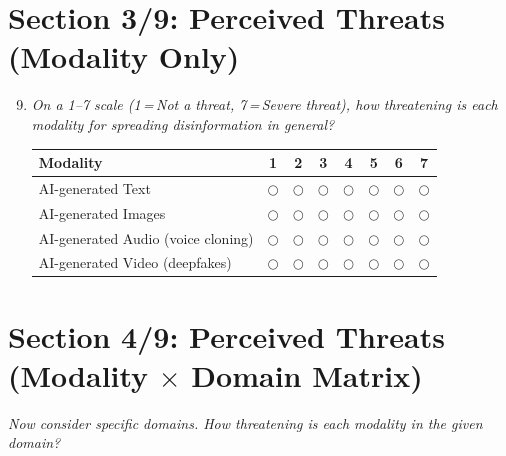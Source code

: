 \section*{Section 3/9: Perceived Threats (Modality Only)}

\begin{enumerate}[label=\textbf{Q\arabic*.}, leftmargin=3em]
\setcounter{enumi}{8}

    \item \textit{On a 1--7 scale (1\,=\,Not a threat, 7\,=\,Severe threat), how threatening is each modality for spreading disinformation in general?}

    \medskip
    \noindent\begin{tabular}{l ccccccc}
    \toprule
    \textbf{Modality} & \textbf{1} & \textbf{2} & \textbf{3} & \textbf{4} & \textbf{5} & \textbf{6} & \textbf{7} \\
    \midrule
    AI-generated Text   & $\bigcirc$ & $\bigcirc$ & $\bigcirc$ & $\bigcirc$ & $\bigcirc$ & $\bigcirc$ & $\bigcirc$ \\
    AI-generated Images & $\bigcirc$ & $\bigcirc$ & $\bigcirc$ & $\bigcirc$ & $\bigcirc$ & $\bigcirc$ & $\bigcirc$ \\
    AI-generated Audio (voice cloning)  & $\bigcirc$ & $\bigcirc$ & $\bigcirc$ & $\bigcirc$ & $\bigcirc$ & $\bigcirc$ & $\bigcirc$ \\
    AI-generated Video (deepfakes)      & $\bigcirc$ & $\bigcirc$ & $\bigcirc$ & $\bigcirc$ & $\bigcirc$ & $\bigcirc$ & $\bigcirc$ \\
    \bottomrule
    \end{tabular}

\end{enumerate}

\section*{Section 4/9: Perceived Threats (Modality $\times$ Domain Matrix)}

\noindent\textit{Now consider specific domains. How threatening is each modality in the given domain?}

